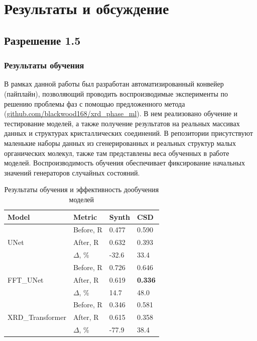 \section{Результаты и обсуждение}

\subsection{Разрешение 1.5\angstrom}

\subsubsection{Результаты обучения}

В рамках данной работы был разработан автоматизированный конвейер (пайплайн), позволяющий проводить воспроизводимые эксперименты по решению проблемы фаз с помощью предложенного метода (\url{github.com/blackwood168/xrd_phase_ml}). В нем реализовано обучение и тестирование моделей, а также получение результатов на реальных массивах данных и структурах кристаллических соединений. В репозитории присутствуют маленькие наборы данных из сгенерированных и реальных структур малых органических молекул, также там представлены веса обученных в работе моделей. Воспроизводимость обучения обеспечивает фиксирование начальных значений генераторов случайных состояний.

\begin{table}[H]
\caption{Результаты обучения и эффективность дообучения моделей}
\label{doposle}
\centering
\footnotesize
\begin{tabular}{|l|l|l|l|} 
\hline
\textbf{Model} & \textbf{Metric} & \textbf{Synth} & \textbf{CSD}  \\ 
\hline
\multirow{3}{*}{UNet} 
& Before, R & 0.477 & 0.590 \\ 
& After, R  & 0.632 & 0.393 \\ 
& $\Delta$, \%       & -32.6 & 33.4  \\
\hline
\multirow{3}{*}{FFT\_UNet}
& Before, R & 0.726 & 0.646 \\ 
& After, R  & 0.619 & \textbf{0.336} \\ 
& $\Delta$, \%       & 14.7  & 48.0  \\
\hline
\multirow{3}{*}{XRD\_Transformer}
& Before, R & 0.346 & 0.581 \\ 
& After, R  & 0.615 & 0.358 \\ 
& $\Delta$, \%       & -77.9 & 38.4  \\
\hline
\end{tabular}
\end{table}

